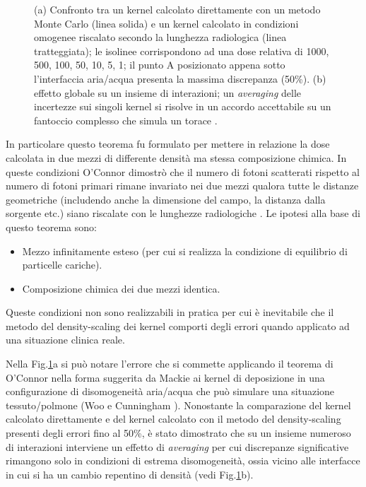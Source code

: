 {\begin{figure}[!t]
\caption{(a) Confronto tra un kernel calcolato direttamente con un metodo Monte Carlo (linea solida) e un kernel calcolato in condizioni omogenee riscalato secondo la lunghezza radiologica (linea tratteggiata); le isolinee corrispondono ad una dose relativa di 1000, 500, 100, 50, 10, 5, 1; il punto A posizionato appena sotto l'interfaccia aria/acqua presenta la massima discrepanza (50\%). (b) effetto globale su un insieme di interazioni; un \textit{averaging} delle incertezze sui singoli kernel si risolve in un accordo accettabile su un fantoccio complesso che simula un torace \cite{Woo1990,Arnfield2000,Ahnesjo1989}.}
\label{fig:kern_dens}
\end{figure}
In particolare questo teorema fu formulato per mettere in relazione la dose calcolata in due mezzi di differente densità ma stessa composizione chimica. In queste condizioni O'Connor dimostrò che il numero di fotoni scatterati rispetto al numero di fotoni primari rimane invariato nei due mezzi qualora tutte le distanze geometriche (includendo anche la dimensione del campo, la distanza dalla sorgente etc.) siano riscalate con le lunghezze radiologiche \cite{OConnor1957}. Le ipotesi alla base di questo teorema sono:
\begin{itemize}
\item Mezzo infinitamente esteso (per cui si realizza la condizione di equilibrio di particelle cariche).
\item Composizione chimica dei due mezzi identica.
\end{itemize}
Queste condizioni non sono realizzabili in pratica per cui è inevitabile che il metodo del density-scaling dei kernel comporti degli errori quando applicato ad una situazione clinica reale.

Nella Fig.\ref{fig:kern_dens}a si può notare l'errore che si commette applicando il teorema di O'Connor nella forma suggerita da Mackie ai kernel di deposizione in una configurazione di disomogeneità aria/acqua che può simulare una situazione tessuto/polmone (Woo e Cunningham \cite{Woo1990}). Nonostante la comparazione del kernel calcolato direttamente e del kernel calcolato con il metodo del density-scaling presenti degli errori fino al 50\%, è stato dimostrato \cite{Ahnesjo1989} che su un insieme numeroso di interazioni interviene un effetto di \textit{averaging} per cui discrepanze significative rimangono solo in condizioni di estrema disomogeneità, ossia vicino alle interfacce in cui si ha un cambio repentino di densità (vedi Fig.\ref{fig:kern_dens}b).

}
